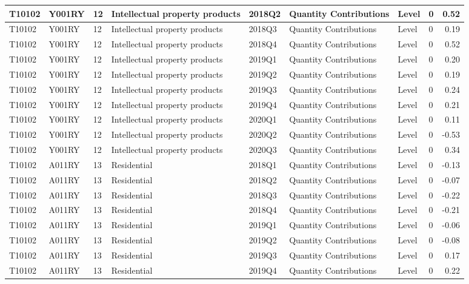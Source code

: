 \documentclass[
]{article}
\begin{document}
\begin{tabular}{l|l|l|l|l|l|l|l|r}
\hline
T10102 & Y001RY & 12 & Intellectual property products & 2018Q2 & Quantity Contributions & Level & 0 & 0.52\\
\hline
T10102 & Y001RY & 12 & Intellectual property products & 2018Q3 & Quantity Contributions & Level & 0 & 0.19\\
\hline
T10102 & Y001RY & 12 & Intellectual property products & 2018Q4 & Quantity Contributions & Level & 0 & 0.52\\
\hline
T10102 & Y001RY & 12 & Intellectual property products & 2019Q1 & Quantity Contributions & Level & 0 & 0.20\\
\hline
T10102 & Y001RY & 12 & Intellectual property products & 2019Q2 & Quantity Contributions & Level & 0 & 0.19\\
\hline
T10102 & Y001RY & 12 & Intellectual property products & 2019Q3 & Quantity Contributions & Level & 0 & 0.24\\
\hline
T10102 & Y001RY & 12 & Intellectual property products & 2019Q4 & Quantity Contributions & Level & 0 & 0.21\\
\hline
T10102 & Y001RY & 12 & Intellectual property products & 2020Q1 & Quantity Contributions & Level & 0 & 0.11\\
\hline
T10102 & Y001RY & 12 & Intellectual property products & 2020Q2 & Quantity Contributions & Level & 0 & -0.53\\
\hline
T10102 & Y001RY & 12 & Intellectual property products & 2020Q3 & Quantity Contributions & Level & 0 & 0.34\\
\hline
T10102 & A011RY & 13 & Residential & 2018Q1 & Quantity Contributions & Level & 0 & -0.13\\
\hline
T10102 & A011RY & 13 & Residential & 2018Q2 & Quantity Contributions & Level & 0 & -0.07\\
\hline
T10102 & A011RY & 13 & Residential & 2018Q3 & Quantity Contributions & Level & 0 & -0.22\\
\hline
T10102 & A011RY & 13 & Residential & 2018Q4 & Quantity Contributions & Level & 0 & -0.21\\
\hline
T10102 & A011RY & 13 & Residential & 2019Q1 & Quantity Contributions & Level & 0 & -0.06\\
\hline
T10102 & A011RY & 13 & Residential & 2019Q2 & Quantity Contributions & Level & 0 & -0.08\\
\hline
T10102 & A011RY & 13 & Residential & 2019Q3 & Quantity Contributions & Level & 0 & 0.17\\
\hline
T10102 & A011RY & 13 & Residential & 2019Q4 & Quantity Contributions & Level & 0 & 0.22\\

\end{tabular}
\end{document}
